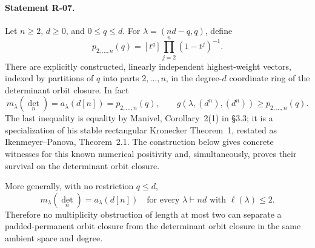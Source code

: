 \documentclass[11pt,a4paper]{article}
\theoremstyle{definition}\newtheorem{definition}{Definition}
\begin{document}
\paragraph{Statement R-07.}
Let $n\geq2$, $d\geq0$, and $0\leq q\leq d$. For
$\lambda=(nd-q,q)$, define
\[
 p_{2,\ldots,n}(q)=[t^q]\prod_{j=2}^n(1-t^j)^{-1}.
\]
There are explicitly constructed, linearly independent highest-weight
vectors, indexed by partitions of $q$ into parts $2,\ldots,n$, in the
degree-$d$ coordinate ring of the determinant orbit closure. In fact
\begin{equation}\label{R07:positive}
 m_\lambda(\det_n)=a_\lambda(d[n])=p_{2,\ldots,n}(q),
 \qquad
 g(\lambda,(d^n),(d^n))\geq p_{2,\ldots,n}(q).
\end{equation}
The last inequality is equality by Manivel, Corollary~2(1) in \S3.3; it is a specialization of his
stable rectangular Kronecker Theorem~1, restated as
Ikenmeyer--Panova, Theorem~2.1. The construction below gives concrete witnesses for this
known numerical positivity and, simultaneously, proves their survival
on the determinant orbit closure.

More generally, with no restriction $q\leq d$,
\begin{equation}\label{R07:alltwo}
 m_\lambda(\det_n)=a_\lambda(d[n])
 \quad\text{for every }\lambda\vdash nd\text{ with }\ell(\lambda)\leq2.
\end{equation}
Therefore no multiplicity obstruction of length at most two can
separate a padded-permanent orbit closure from the determinant orbit
closure in the same ambient space and degree.
\end{document}
